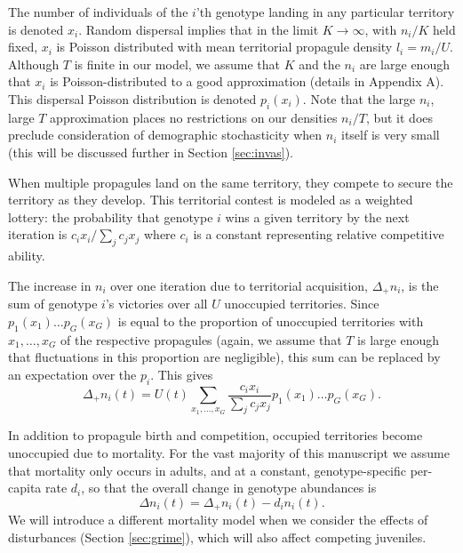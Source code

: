 \documentclass[11pt]{article}
\begin{document}
The number of individuals of the $i$'th genotype landing in any particular territory is denoted $x_i$. Random dispersal implies that in the limit $K\rightarrow \infty$, with $n_i/K$ held fixed, $x_i$ is Poisson distributed with mean territorial propagule density $l_i=m_i/U$. Although $T$ is finite in our model, we assume that $K$ and the $n_i$ are large enough that $x_i$ is Poisson-distributed to a good approximation (details in Appendix A). This dispersal Poisson distribution is denoted $p_i(x_i)$. Note that the large $n_i$, large $T$ approximation places no restrictions on our densities $n_i/T$, but it does preclude consideration of demographic stochasticity when $n_i$ itself is very small (this will be discussed further in Section \ref{sec:invas}).

When multiple propagules land on the same territory, they compete to secure the territory as they develop. This territorial contest is modeled as a weighted lottery: the probability that genotype $i$ wins a given territory by the next iteration is $c_i x_i/\sum_j c_j x_j$ where $c_i$ is a constant representing relative competitive ability. 

The increase in $n_i$ over one iteration due to territorial acquisition, $\Delta_+ n_i$, is the sum of genotype $i$'s victories over all $U$ unoccupied territories. Since $p_1(x_1)\ldots p_G(x_G)$ is equal to the proportion of unoccupied territories with $x_1,\ldots,x_G$ of the respective propagules (again, we assume that $T$ is large enough that fluctuations in this proportion are negligible), this sum can be replaced by an expectation over the $p_i$. This gives
\begin{equation}
\Delta_+ n_i(t)=U(t)\sum_{x_1,\ldots,x_G} \frac{c_i x_i}{\sum_j c_j x_j} p_1(x_1)\ldots p_G(x_G). \label{eq:growthsumuncoupled}
\end{equation}

In addition to propagule birth and competition, occupied territories become unoccupied due to mortality. For the vast majority of this manuscript we assume that mortality only occurs in adults, and at a constant, genotype-specific per-capita rate $d_i$, so that the overall change in genotype abundances is
\begin{equation}
\Delta n_i(t)=\Delta_+ n_i(t)-d_i n_i(t). \label{eq:delttot}
\end{equation}
We will introduce a different mortality model when we consider the effects of disturbances (Section \ref{sec:grime}), which will also affect competing juveniles. 
\end{document}
